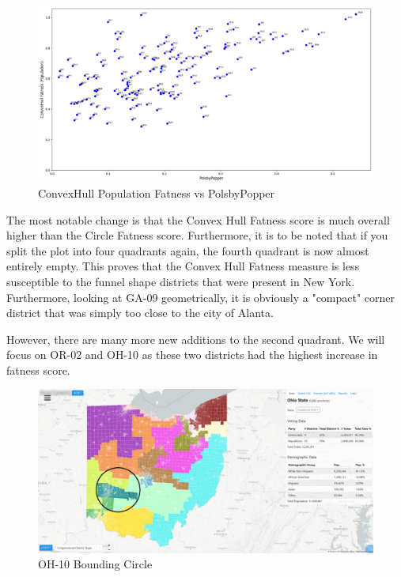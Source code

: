 \documentclass[letterpaper]{article}
\begin{document}
\begin{figure}[H]
	\includegraphics[width=\linewidth]{./figures/convexHullPopulationFatnessVPP.png}
	\caption{ConvexHull Population Fatness vs PolsbyPopper}
	\label{fig:cvHullPopVPP}
\end{figure}

The most notable change is that the Convex Hull Fatness score is much overall higher than the Circle Fatness score. Furthermore, it is to be noted that if you split the plot into four quadrants again, the fourth quadrant is now almost entirely empty. This proves that the Convex Hull Fatness measure is less susceptible to the funnel shape districts that were present in New York. Furthermore, looking at GA-09 geometrically, it is obviously a "compact" corner district that was simply too close to the city of Alanta. 

However, there are many more new additions to the second quadrant. We will focus on OR-02 and OH-10 as these two districts had the highest increase in fatness score.

\begin{figure}[H]
	\includegraphics[width=\linewidth]{./figures/OH-10-BoundingCircle.png}
	\caption{OH-10 Bounding Circle}
	\label{fig:oh10boundingCircle}
\end{figure}
\end{document}
